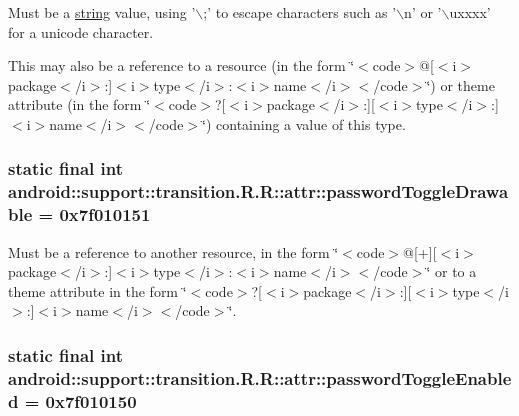 Must be a \hyperlink{classandroid_1_1support_1_1transition_1_1_r_1_1string}{string} value, using '$\backslash$;' to escape characters such as '$\backslash$n' or '$\backslash$uxxxx' for a unicode character. 

This may also be a reference to a resource (in the form \char`\"{}$<$code$>$@\mbox{[}$<$i$>$package$<$/i$>$:\mbox{]}$<$i$>$type$<$/i$>$:$<$i$>$name$<$/i$>$$<$/code$>$\char`\"{}) or theme attribute (in the form \char`\"{}$<$code$>$?\mbox{[}$<$i$>$package$<$/i$>$:\mbox{]}\mbox{[}$<$i$>$type$<$/i$>$:\mbox{]}$<$i$>$name$<$/i$>$$<$/code$>$\char`\"{}) containing a value of this type. \hypertarget{classandroid_1_1support_1_1transition_1_1_r_1_1attr_3706784e1e1901f72518a0dd7dd6e66f}{
\subsubsection[{passwordToggleDrawable}]{\setlength{\rightskip}{0pt plus 5cm}static final int android::support::transition.R.R::attr::passwordToggleDrawable = 0x7f010151}}
\label{classandroid_1_1support_1_1transition_1_1_r_1_1attr_3706784e1e1901f72518a0dd7dd6e66f}


Must be a reference to another resource, in the form \char`\"{}$<$code$>$@\mbox{[}+\mbox{]}\mbox{[}$<$i$>$package$<$/i$>$:\mbox{]}$<$i$>$type$<$/i$>$:$<$i$>$name$<$/i$>$$<$/code$>$\char`\"{} or to a theme attribute in the form \char`\"{}$<$code$>$?\mbox{[}$<$i$>$package$<$/i$>$:\mbox{]}\mbox{[}$<$i$>$type$<$/i$>$:\mbox{]}$<$i$>$name$<$/i$>$$<$/code$>$\char`\"{}. \hypertarget{classandroid_1_1support_1_1transition_1_1_r_1_1attr_a4c40007e90568ac2a80467134277707}{
\subsubsection[{passwordToggleEnabled}]{\setlength{\rightskip}{0pt plus 5cm}static final int android::support::transition.R.R::attr::passwordToggleEnabled = 0x7f010150}}
\label{classandroid_1_1support_1_1transition_1_1_r_1_1attr_a4c40007e90568ac2a80467134277707}


